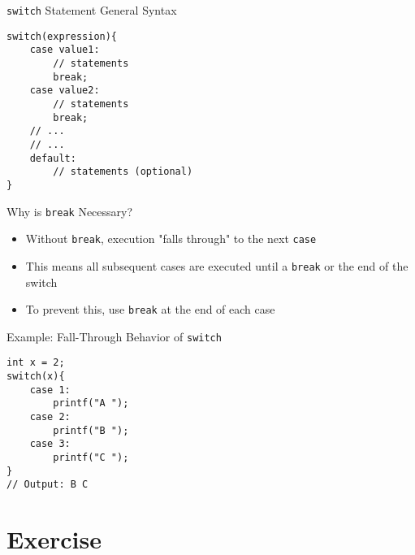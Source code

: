 \documentclass[12pt, aspectratio=169]{beamer}
\begin{document}
    \begin{frame}[fragile]{\texttt{switch} Statement General Syntax}
        \begin{verbatim}
switch(expression){
    case value1:
        // statements
        break;
    case value2:
        // statements
        break;
    // ...
    // ...
    default:
        // statements (optional)
}
        \end{verbatim}
    \end{frame}


    \begin{frame}{Why is \texttt{break} Necessary?}
        \begin{itemize}
            \item Without \texttt{break}, execution "falls through" to the next \texttt{case}
            \item This means all subsequent cases are executed until a \texttt{break} or the end of the switch
            \item To prevent this, use \texttt{break} at the end of each case
        \end{itemize}
    \end{frame}


    \begin{frame}[fragile]{Example: Fall-Through Behavior of \texttt{switch}}
        \begin{verbatim}
int x = 2;
switch(x){
    case 1: 
        printf("A ");
    case 2: 
        printf("B ");
    case 3: 
        printf("C ");
}
// Output: B C
        \end{verbatim}
    \end{frame}




    \section{Exercise}
\end{document}
